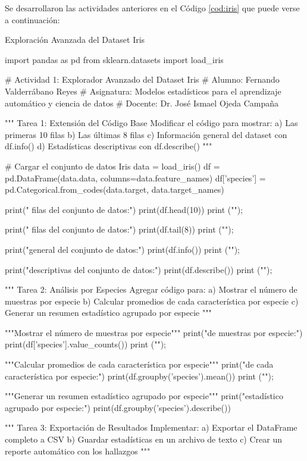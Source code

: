 \documentclass[11pt,letterpaper]{article}
\begin{document}
Se desarrollaron las actividades anteriores en el Código \ref{cod:iris} que puede verse a continuación:

\begin{codigo}[label=cod:iris]{Exploración Avanzada del Dataset Iris}

import pandas as pd
from sklearn.datasets import load_iris

# Actividad 1: Explorador Avanzado del Dataset Iris
# Alumno: Fernando Valderrábano Reyes
# Asignatura: Modelos estadísticos para el aprendizaje automático y ciencia de datos
# Docente: Dr. José Ismael Ojeda Campaña

"""
Tarea 1: Extensión del Código Base
Modificar el código para mostrar:
a) Las primeras 10 filas
b) Las últimas 8 filas
c) Información general del dataset con df.info()
d) Estadísticas descriptivas con df.describe()
"""

# Cargar el conjunto de datos Iris
data = load_iris()
df = pd.DataFrame(data.data, columns=data.feature_names)
df['species'] = pd.Categorical.from_codes(data.target, data.target_names)

print(" filas del conjunto de datos:")
print(df.head(10))
print ("\n");

print(" filas del conjunto de datos:")
print(df.tail(8))
print ("\n");

print(" general del conjunto de datos:")
print(df.info())
print ("\n");

print("\nEstadisticas descriptivas del conjunto de datos:")
print(df.describe())
print ("\n");

"""
Tarea 2: Análisis por Especies
Agregar código para:
a) Mostrar el número de muestras por especie
b) Calcular promedios de cada característica por especie
c) Generar un resumen estadístico agrupado por especie
"""

"""Mostrar el número de muestras por especie"""
print(" de muestras por especie:")
print(df['species'].value_counts())
print ("\n");

"""Calcular promedios de cada característica por especie"""
print("\nPromedios de cada característica por especie:")
print(df.groupby('species').mean())
print ("\n");

"""Generar un resumen estadístico agrupado por especie"""
print("\nResumen estadístico agrupado por especie:")
print(df.groupby('species').describe())

"""
Tarea 3: Exportación de Resultados
Implementar:
a) Exportar el DataFrame completo a CSV
b) Guardar estadísticas en un archivo de texto
c) Crear un reporte automático con los hallazgos
"""


\end{codigo}
\end{document}

